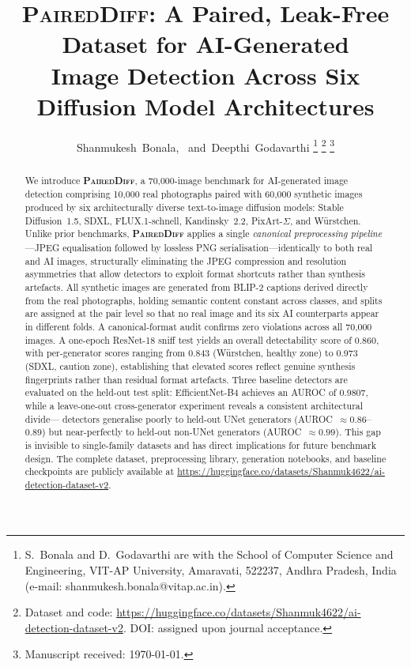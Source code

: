 \documentclass[journal]{IEEEtran}
\newcommand{\datasetname}{\textsc{PairedDiff}}
\begin{document}
\title{\datasetname: A Paired, Leak-Free Dataset for AI-Generated\\
Image Detection Across Six Diffusion Model Architectures}

\author{Shanmukesh~Bonala,~
        and~Deepthi~Godavarthi%
\thanks{S.~Bonala and D.~Godavarthi are with the School of Computer
Science and Engineering, VIT-AP University, Amaravati, 522237,
Andhra Pradesh, India (e-mail: shanmukesh.bonala@vitap.ac.in).}%
\thanks{Dataset and code: \url{https://huggingface.co/datasets/Shanmuk4622/ai-detection-dataset-v2}.
DOI: assigned upon journal acceptance.}%
\thanks{Manuscript received: \today.}}

\maketitle

\begin{abstract}
We introduce \textbf{\datasetname}, a 70{,}000-image benchmark for
AI-generated image detection comprising 10{,}000 real photographs
paired with 60{,}000 synthetic images produced by six architecturally
diverse text-to-image diffusion models: Stable Diffusion~1.5, SDXL,
FLUX.1-schnell, Kandinsky~2.2, PixArt-$\Sigma$, and W\"{u}rstchen.
Unlike prior benchmarks, \textbf{\datasetname} applies a single
\emph{canonical preprocessing pipeline}---JPEG equalisation followed
by lossless PNG serialisation---identically to both real and AI
images, structurally eliminating the JPEG compression and resolution
asymmetries that allow detectors to exploit format shortcuts rather
than synthesis artefacts.
All synthetic images are generated from BLIP-2 captions derived
directly from the real photographs, holding semantic content constant
across classes, and splits are assigned at the pair level so that no
real image and its six AI counterparts appear in different folds.
A canonical-format audit confirms zero violations across all
70{,}000 images.
A one-epoch ResNet-18 sniff test yields an overall detectability score
of 0.860, with per-generator scores ranging from 0.843 (W\"{u}rstchen,
healthy zone) to 0.973 (SDXL, caution zone), establishing that
elevated scores reflect genuine synthesis fingerprints rather than
residual format artefacts.
Three baseline detectors are evaluated on the held-out test split:
EfficientNet-B4 achieves an AUROC of 0.9807, while a leave-one-out
cross-generator experiment reveals a consistent architectural divide---
detectors generalise poorly to held-out UNet generators
(AUROC~$\approx 0.86$--$0.89$) but near-perfectly to held-out
non-UNet generators (AUROC~$\approx 0.99$).
This gap is invisible to single-family datasets and has direct
implications for future benchmark design.
The complete dataset, preprocessing library, generation notebooks,
and baseline checkpoints are publicly available at
\url{https://huggingface.co/datasets/Shanmuk4622/ai-detection-dataset-v2}.
\end{abstract}
\end{document}
